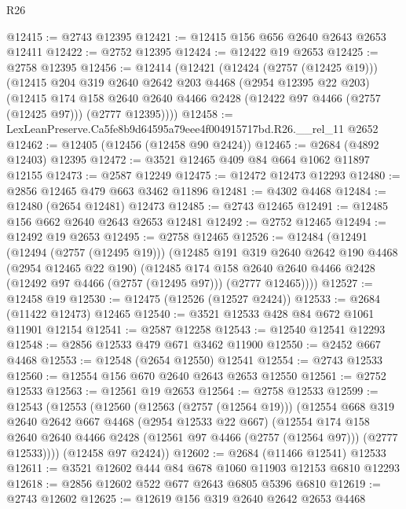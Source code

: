 \begin{lexlean}{R26}
\begin{coremodule}
@12415 := @2743 @12395
@12421 := @12415 @156 @656 @2640 @2643 @2653 @12411
@12422 := @2752 @12395
@12424 := @12422 @19 @2653
@12425 := @2758 @12395
@12456 := @12414
    (@12421
      (@12424 (@2757 (@12425 @19)))
      (@12415
        @204
        @319
        @2640
        @2642
        @203
        @4468
        (@2954 @12395 @22 @203)
        (@12415
          @174
          @158
          @2640
          @2640
          @4466
          @2428
          (@12422 @97 @4466 (@2757 (@12425 @97)))
          (@2777 @12395))))
@12458 := LexLeanPreserve.Ca5fe8b9d64595a79eee4f004915717bd.R26.__rel_11 @2652
@12462 := @12405 (@12456 (@12458 @90 @2424))
@12465 := @2684 (@4892 @12403) @12395
@12472 := @3521 @12465 @409 @84 @664 @1062 @11897 @12155
@12473 := @2587 @12249
@12475 := @12472 @12473 @12293
@12480 := @2856 @12465 @479 @663 @3462 @11896
@12481 := @4302 @4468
@12484 := @12480 (@2654 @12481) @12473
@12485 := @2743 @12465
@12491 := @12485 @156 @662 @2640 @2643 @2653 @12481
@12492 := @2752 @12465
@12494 := @12492 @19 @2653
@12495 := @2758 @12465
@12526 := @12484
    (@12491
      (@12494 (@2757 (@12495 @19)))
      (@12485
        @191
        @319
        @2640
        @2642
        @190
        @4468
        (@2954 @12465 @22 @190)
        (@12485
          @174
          @158
          @2640
          @2640
          @4466
          @2428
          (@12492 @97 @4466 (@2757 (@12495 @97)))
          (@2777 @12465))))
@12527 := @12458 @19
@12530 := @12475 (@12526 (@12527 @2424))
@12533 := @2684 (@11422 @12473) @12465
@12540 := @3521 @12533 @428 @84 @672 @1061 @11901 @12154
@12541 := @2587 @12258
@12543 := @12540 @12541 @12293
@12548 := @2856 @12533 @479 @671 @3462 @11900
@12550 := @2452 @667 @4468
@12553 := @12548 (@2654 @12550) @12541
@12554 := @2743 @12533
@12560 := @12554 @156 @670 @2640 @2643 @2653 @12550
@12561 := @2752 @12533
@12563 := @12561 @19 @2653
@12564 := @2758 @12533
@12599 := @12543
    (@12553
      (@12560
        (@12563 (@2757 (@12564 @19)))
        (@12554
          @668
          @319
          @2640
          @2642
          @667
          @4468
          (@2954 @12533 @22 @667)
          (@12554
            @174
            @158
            @2640
            @2640
            @4466
            @2428
            (@12561 @97 @4466 (@2757 (@12564 @97)))
            (@2777 @12533))))
      (@12458 @97 @2424))
@12602 := @2684 (@11466 @12541) @12533
@12611 := @3521 @12602 @444 @84 @678 @1060 @11903 @12153 @6810 @12293
@12618 := @2856 @12602 @522 @677 @2643 @6805 @5396 @6810
@12619 := @2743 @12602
@12625 := @12619 @156 @319 @2640 @2642 @2653 @4468

\end{coremodule}
\end{lexlean}
